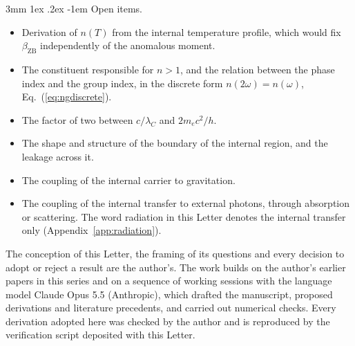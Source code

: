 \documentclass[%
 reprint, amsmath,amssymb, aps, prb, ]{revtex4-2}
\makeatletter
\numberwithin{equation}{section}
\renewcommand\paragraph{%
  \@startsection{paragraph}{4}{\z@}%
    {3mm \@plus 1ex \@minus .2ex}%
    {-1em}%
    {\normalfont\normalsize\itshape}}
\makeatother
\begin{document}
\paragraph{Open items.}
\begin{itemize}[leftmargin=2.4em]
\item[O1.] Derivation of $n(T)$ from the internal temperature profile, which would fix $\beta_{\text{ZB}}$ independently of the anomalous moment.
\item[O2.] The constituent responsible for $n > 1$, and the relation between the phase index and the group index, in the discrete form $n(2\omega) = n(\omega)$, Eq.~(\ref{eq:ngdiscrete}).
\item[O3.] The factor of two between $c/\lambda_C$ and $2m_ec^2/h$.
\item[O4.] The shape and structure of the boundary of the internal region, and the leakage across it.
\item[O5.] The coupling of the internal carrier to gravitation.
\item[O6.] The coupling of the internal transfer to external photons, through absorption or scattering. The word radiation in this Letter denotes the internal transfer only (Appendix~\ref{app:radiation}).
\end{itemize}

\begin{acknowledgments}
The conception of this Letter, the framing of its questions and every decision to adopt or reject a result are the author's. The work builds on the author's earlier papers in this series and on a sequence of working sessions with the language model Claude Opus 5.5 (Anthropic), which drafted the manuscript, proposed derivations and literature precedents, and carried out numerical checks. Every derivation adopted here was checked by the author and is reproduced by the verification script deposited with this Letter.
\end{acknowledgments}
\end{document}
